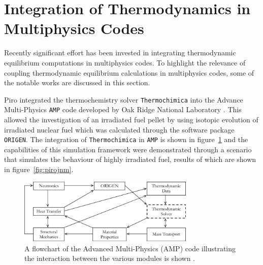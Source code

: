 \section{Integration of Thermodynamics in Multiphysics Codes}

	Recently significant effort has been invested in integrating thermodynamic equilibrium computations in multiphysics codes.  To highlight the relevance of coupling thermodynamic equilibrium calculations in multiphysics codes, some of the notable works are discussed in this section.
	
	Piro integrated the thermochemistry solver \texttt{Thermochimica} into the Advance Multi-Physics \texttt{AMP} code developed by Oak Ridge National Laboratory \cite{Piro11b}. This allowed the investigation of an irradiated fuel pellet by using isotopic evolution of irradiated nuclear fuel which was calculated through the software package \texttt{ORIGEN}. The integration of \texttt{Thermochimica} in \texttt{AMP} is shown in figure~\ref{fig:amp} and the capabilities of this simulation framework were demonstrated through a scenario that simulates the behaviour of highly irradiated  fuel, results of which are shown in figure~\ref{fig:pirojnm}.
	\begin{figure}[htbp]
		\begin{center}
		\includegraphics[width=0.75\textwidth]{figures/AMP_TC.png}
		\caption{A flowchart of the Advanced Multi-Physics (AMP) code illustrating the interaction between the various modules is shown \cite{Piro11b}.}
		\label{fig:amp}
		\end{center}
	\end{figure}

